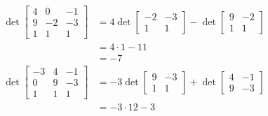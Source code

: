 \documentclass[12pt]{article}
\begin{document}
\begin{enumerate}
            \begin{align*}
                  \det \begin{bmatrix}
                             4 & 0  & -1 \\
                             9 & -2 & -3 \\
                             1 & 1  & 1
                       \end{bmatrix} & =4 \det \begin{bmatrix}
                                                     -2 & -3 \\
                                                     1  & 1
                                               \end{bmatrix}-\det \begin{bmatrix}
                                                                        9 & -2 \\
                                                                        1 & 1
                                                                  \end{bmatrix}  \\
                                       & = 4 \cdot 1 - 11                         \\
                                       & = -7                                     \\
                  \det \begin{bmatrix}
                             -3 & 4 & -1 \\
                             0  & 9 & -3 \\
                             1  & 1 & 1
                       \end{bmatrix} & =-3 \det \begin{bmatrix}
                                                      9 & -3 \\
                                                      1 & 1
                                                \end{bmatrix}+\det \begin{bmatrix}
                                                                         4 & -1 \\
                                                                         9 & -3
                                                                   \end{bmatrix} \\
                                       & = -3 \cdot 12 - 3                        \\

\end{align*}
\end{enumerate}
\end{document}
